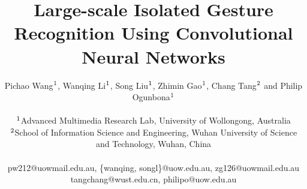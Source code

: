 \documentclass[10pt, a4paper, conference]{IEEEtran}
\begin{document}
%
\title{Large-scale Isolated Gesture Recognition Using Convolutional Neural Networks}


\author{Pichao Wang$^{\rm 1}$, Wanqing Li$^{\rm 1}$, Song Liu$^{\rm 1}$, Zhimin Gao$^{\rm 1}$, Chang Tang$^{\rm 2}$ and Philip Ogunbona$^{\rm 1}$\\
\\
$^{\rm 1}$Advanced Multimedia Research Lab, University of Wollongong, Australia\\
$^{\rm 2}$School of Information Science and Engineering, Wuhan University of Science and Technology, Wuhan, China\\
\\
{ pw212@uowmail.edu.au, \{wanqing, songl\}@uow.edu.au, zg126@uowmail.edu.au}\\
{ tangchang@wust.edu.cn, philipo@uow.edu.au}
}






\maketitle
\end{document}
